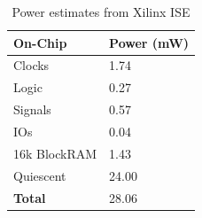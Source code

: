 \begin{table}[h]
    \centering
    \begin{tabular}{|l|l|}
        \hline
        \textbf{On-Chip} & \textbf{Power (mW)} \\ \hline
        Clocks           & 1.74                \\ \hline
        Logic            & 0.27                \\ \hline
        Signals          & 0.57                \\ \hline
        IOs              & 0.04                \\ \hline
        16k BlockRAM     & 1.43                \\ \hline
        Quiescent        & 24.00               \\ \hline
        \textbf{Total}   & 28.06               \\ \hline
    \end{tabular}
    \caption{Power estimates from Xilinx ISE}
    \label{tab:power_consumption}
\end{table}
